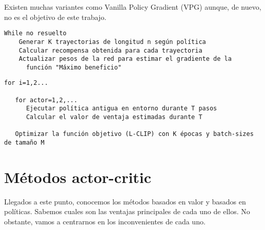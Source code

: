 \documentclass[11pt,fleqn]{book} %
\begin{document}
Existen muchas variantes como Vanilla Policy Gradient (VPG) \cite{article:VPG} aunque, de nuevo, no es el objetivo de este trabajo.\\

\begin{verbatim}
While no resuelto
    Generar K trayectorias de longitud n según política
    Calcular recompensa obtenida para cada trayectoria
    Actualizar pesos de la red para estimar el gradiente de la
      función "Máximo beneficio"
\end{verbatim}




\begin{verbatim}
for i=1,2... 

   for actor=1,2,...
      Ejecutar política antigua en entorno durante T pasos
      Calcular el valor de ventaja estimadas durante T
   
   Optimizar la función objetivo (L-CLIP) con K épocas y batch-sizes de tamaño M
\end{verbatim}

\section{Métodos actor-critic}\label{sec:actorcritic}

Llegados a este punto, conocemos los métodos basados en valor y basados en políticas. Sabemos cuales son las ventajas principales de cada uno de ellos. No obstante, vamos a centrarnos en los inconvenientes de cada uno. \\
\end{document}
